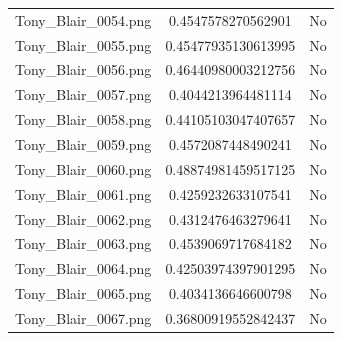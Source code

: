 \documentclass[12pt]{article}
\begin{document}
\begin{center}
\begin{tabular}{ccc}
Tony\_Blair\_0054.png & 0.4547578270562901 & No\\
Tony\_Blair\_0055.png & 0.45477935130613995 & No\\
Tony\_Blair\_0056.png & 0.46440980003212756 & No\\
Tony\_Blair\_0057.png & 0.4044213964481114 & No\\
Tony\_Blair\_0058.png & 0.44105103047407657 & No\\
Tony\_Blair\_0059.png & 0.4572087448490241 & No\\
Tony\_Blair\_0060.png & 0.48874981459517125 & No\\
Tony\_Blair\_0061.png & 0.4259232633107541 & No\\
Tony\_Blair\_0062.png & 0.4312476463279641 & No\\
Tony\_Blair\_0063.png & 0.4539069717684182 & No\\
Tony\_Blair\_0064.png & 0.42503974397901295 & No\\
Tony\_Blair\_0065.png & 0.4034136646600798 & No\\
Tony\_Blair\_0067.png & 0.36800919552842437 & No\\

\end{tabular}


\end{center}
\end{document}
